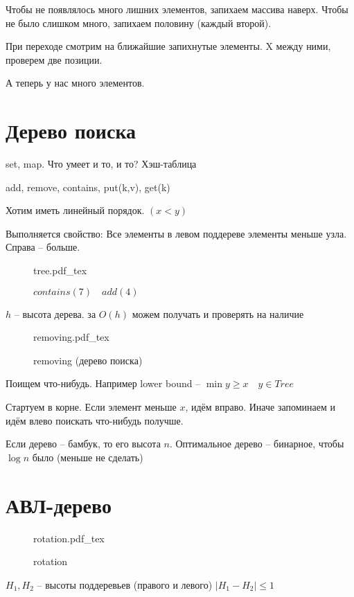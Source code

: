 \documentclass{book}
\theoremstyle{definition}
\newcommand{\incfig}[1]{%
    \def\svgwidth{\columnwidth}
    {#1.pdf_tex}
}
\begin{document}
 Чтобы не появлялось много лишних элементов, запихаем массива наверх. Чтобы не было слишком много, запихаем половину (каждый второй).

 При переходе смотрим на ближайшие запихнутые элементы. X между ними, проверем две позиции.

 А теперь у нас много элементов.

 \section{Дерево поиска}

set, map. Что умеет и то, и то? Хэш-таблица
 
add, remove, contains, put(k,v), get(k)

Хотим иметь линейный порядок.  $(x<y)$

Выполняется свойство: Все элементы в левом поддереве элементы меньше узла. Справа -- больше.

\begin{figure}[!ht]
    \centering
    \incfig{tree}
    \caption{$contains(7)\quad add(4)$}
    \label{fig:tree}
\end{figure}



$h$ -- высота дерева. за  $O(h)$ можем получать и проверять на наличие

\begin{figure}[!ht]
    \centering
    \incfig{removing}
    \caption{removing (дерево поиска)}
    \label{fig:removing}
\end{figure}

Поищем что-нибудь. Например lower bound -- $\min y \geqslant x\quad y\in Tree$

Стартуем в корне. Если элемент меньше $x$, идём вправо. Иначе запоминаем и идём влево поискать что-нибудь получше. 

Если дерево -- бамбук, то его высота  $n$. Оптимальное дерево -- бинарное, чтобы  $\log n$ было (меньше не сделать)

\section{АВЛ-дерево}

\begin{figure}[!ht]
    \centering
    \incfig{rotation}
    \caption{rotation}
    \label{fig:rotation}
\end{figure}

$H_1, H_2$ -- высоты поддеревьев (правого и левого) $|H_1-H_2| \leqslant 1$
\end{document}
